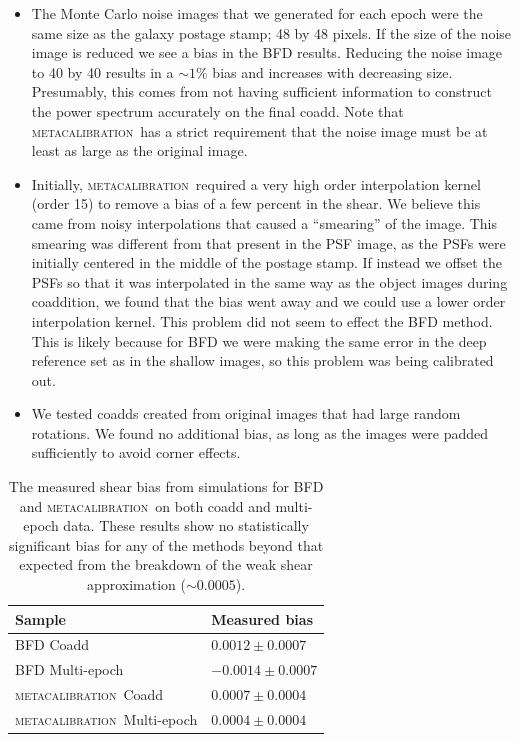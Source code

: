 \documentclass[fleqn,useAMS,usenatbib]{mnras}
\newcommand{\mcal}{\textsc{metacalibration}}
\begin{document}
\begin{itemize}

\item The Monte Carlo noise images that we generated for each epoch were the
same size as the galaxy postage stamp; 48 by 48 pixels.  If the size of the
noise image is reduced we see a bias in the BFD results.  Reducing the noise
image to 40 by 40 results in a $\sim 1\%$ bias and increases with decreasing 
size.  Presumably, this comes from not having sufficient information to
construct the power spectrum accurately on the final coadd.  Note that \mcal\
has a strict requirement that the noise image must be at least as large as the
original image.

\item Initially, \mcal\ required a very high order interpolation kernel (order
15) to remove a bias of a few percent in the shear.  We believe this came from
noisy interpolations that caused a ``smearing'' of the image.  This smearing
was different from that present in the PSF image, as the PSFs were initially
centered in the middle of the postage stamp.  If instead we offset the PSFs so
that it was interpolated in the same way as the object images during
coaddition, we found that the bias went away and we could use a lower order
interpolation kernel.  This problem did not seem to effect the BFD method.
This is likely because for BFD we were making the same error in the deep reference
set as in the shallow images, so this problem was being calibrated out.

\item We tested coadds created from original images that had large random
rotations.  We found no additional bias, as long as the images were padded
sufficiently to avoid corner effects.

\end{itemize}

\begin{table}
\begin{tabular}{ll}
\hline
Sample & Measured bias \\ \hline
BFD Coadd & $0.0012 \pm 0.0007$ \\
BFD Multi-epoch & $-0.0014 \pm 0.0007$ \\
\mcal\ Coadd & $0.0007 \pm 0.0004$  \\
\mcal\ Multi-epoch & $0.0004 \pm 0.0004$  \\ \hline
\end{tabular}
\caption{The measured shear bias from simulations for BFD and \mcal\ on both 
coadd and multi-epoch data.  These results show no statistically significant 
bias for any of the methods beyond that expected from the breakdown
of the weak shear approximation ($\sim 0.0005$).}
\label{tab:results}
\end{table}
\end{document}
